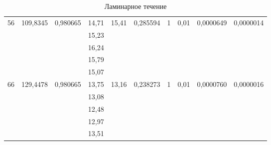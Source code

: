 \documentclass[a4paper, 12pt]{article}
\begin{document}
\begin{table}[h!]
\begin{tabular}{|c|c|c|c|c|c|c|c|c|c|}
\multirow{5}{*}{56} & \multirow{5}{*}{109,8345} & \multirow{5}{*}{0,980665} & 14,71 & \multirow{5}{*}{15,41}         & \multirow{5}{*}{0,285594}         & \multirow{5}{*}{1} & \multirow{5}{*}{0,01} & \multirow{5}{*}{0,0000649} & \multirow{5}{*}{0,0000014}   \\ \cline{4-4}
                    &                           &                           & 15,23 &                                &                                   &                    &                       &                            &                              \\ \cline{4-4}
                    &                           &                           & 16,24 &                                &                                   &                    &                       &                            &                              \\ \cline{4-4}
                    &                           &                           & 15,79 &                                &                                   &                    &                       &                            &                              \\ \cline{4-4}
                    &                           &                           & 15,07 &                                &                                   &                    &                       &                            &                              \\ \hline
\multirow{5}{*}{66} & \multirow{5}{*}{129,4478} & \multirow{5}{*}{0,980665} & 13,75 & \multirow{5}{*}{13,16}         & \multirow{5}{*}{0,238273}         & \multirow{5}{*}{1} & \multirow{5}{*}{0,01} & \multirow{5}{*}{0,0000760} & \multirow{5}{*}{0,0000016}   \\ \cline{4-4}
                    &                           &                           & 13,08 &                                &                                   &                    &                       &                            &                              \\ \cline{4-4}
                    &                           &                           & 12,48 &                                &                                   &                    &                       &                            &                              \\ \cline{4-4}
                    &                           &                           & 12,97 &                                &                                   &                    &                       &                            &                              \\ \cline{4-4}
                    &                           &                           & 13,51 &                                &                                   &                    &                       &                            &                              \\ \hline
\end{tabular}
\caption{Ламинарное течение}
\label{tab4}
\end{table}
\end{document}
